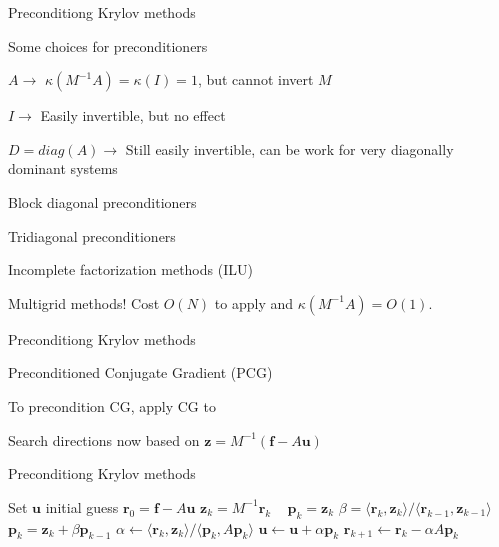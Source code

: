 \documentclass[18pt,xcolor=table]{beamer}
\begin{document}
\begin{frame}{Preconditiong Krylov methods}
\begin{block}{Some choices for preconditioners}
\bit
\item $A \rightarrow$ $\kappa(M^{-1}A) = \kappa(I) = 1$, but cannot invert $M$
\item $I \rightarrow$ Easily invertible, but no effect
\item $D = diag(A) \rightarrow$ Still easily invertible, can be work for very diagonally dominant systems
\item Block diagonal preconditioners
\item Tridiagonal preconditioners
\item Incomplete factorization methods (ILU)
\item Multigrid methods! Cost $O(N)$ to apply and $\kappa(M^{-1}A) = O(1)$.
\eit
\end{block}
\end{frame}

\begin{frame}{Preconditiong Krylov methods}
\begin{block}{Preconditioned Conjugate Gradient (PCG)}
\bit
\item To precondition CG, apply CG to
\item Search directions now based on $\mathbf{z} = M^{-1}(\mathbf{f} - A\mathbf{u})$ 
\eit
\end{block}
\end{frame}

\begin{frame}{Preconditiong Krylov methods}
\begin{algorithm}[H]
\caption{Preconditioned Conjugate Gradient (PCG)}
\begin{algorithmic}
\State Set $\mathbf{u}$ initial guess
\State $\mathbf{r}_0 = \mathbf{f} - A\mathbf{u}$
\State $\mathbf{z}_k = M^{-1}\mathbf{r}_k$ \
\State $\mathbf{p}_k = \mathbf{z}_k$
\Else
\State $\beta  = \langle \mathbf{r}_k, \mathbf{z}_k \rangle / \langle \mathbf{r}_{k-1}, \mathbf{z}_{k-1} \rangle$
\State $\mathbf{p}_k = \mathbf{z}_k + \beta \mathbf{p}_{k-1}$
\EndIf
\State $\alpha \leftarrow \langle \mathbf{r}_k, \mathbf{z}_k \rangle / \langle \mathbf{p}_k, A\mathbf{p}_k \rangle$
\State $\mathbf{u} \leftarrow \mathbf{u} + \alpha\mathbf{p}_k$
\State $\mathbf{r}_{k+1} \leftarrow \mathbf{r}_k - \alpha A\mathbf{p}_k$
\EndFor
\end{algorithmic}
\end{algorithm}
\end{frame}
\end{document}
